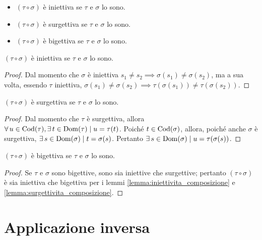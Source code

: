 \begin{itemize}
    \item $(\tau \circ \sigma)$ è iniettiva se $\tau$ e $\sigma$ lo sono.
    \item $(\tau \circ \sigma)$ è surgettiva se $\tau$ e $\sigma$ lo sono.
    \item $(\tau \circ \sigma)$ è bigettiva se $\tau$ e $\sigma$ lo sono.
\end{itemize}

\begin{lemma}
    \label{lemma:iniettivita_composizione}
    $(\tau \circ \sigma)$ è iniettiva se $\tau$ e $\sigma$ lo sono.
\end{lemma}

\begin{proof}
    Dal momento che $\sigma$ è iniettiva $s_1 \neq s_2 \implies \sigma(s_1) \neq \sigma(s_2)$,
    ma a sua volta, essendo $\tau$ iniettiva, $\sigma(s_1) \neq \sigma(s_2) \implies
        \tau(\sigma(s_1)) \neq \tau(\sigma(s_2))$.
\end{proof}

\begin{lemma}
    \label{lemma:surgettivita_composizione}
    $(\tau \circ \sigma)$ è surgettiva se $\tau$ e $\sigma$ lo sono.
\end{lemma}

\begin{proof}
    Dal momento che $\tau$ è surgettiva, allora $\forall u \in
    \Codom(\tau), \exists t \in \Dom(\tau) \mid u = \tau(t)$.
    Poiché $t \in \operatorname{Cod}(\sigma)$, allora, poiché anche
    $\sigma$ è surgettiva, $\exists s \in \Dom(\sigma) \mid
        t = \sigma(s)$. Pertanto $\exists s \in \Dom(\sigma) \mid
        u = \tau(\sigma(s))$. 
\end{proof}

\begin{lemma}
    $(\tau \circ \sigma)$ è bigettiva se $\tau$ e $\sigma$ lo sono.
\end{lemma}

\begin{proof}
    Se $\tau$ e $\sigma$ sono bigettive, sono sia iniettive che surgettive;
    pertanto $(\tau \circ \sigma)$ è sia iniettiva che bigettiva per i
    lemmi \ref{lemma:iniettivita_composizione} e
    \ref{lemma:surgettivita_composizione}.
\end{proof}

\section{Applicazione inversa}


